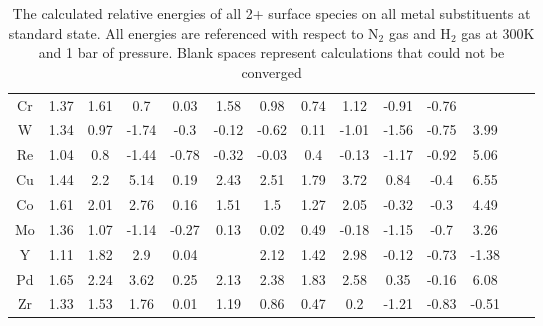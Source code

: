 \documentclass{article}
\begin{document}
\begin{table}
\begin{center}
\begin{tabular}{| c | c | c | c | c | c | c | c | c | c | c | c | c | c |}
Cr & 1.37 & 1.61 & 0.7 & 0.03 & 1.58 & 0.98 & 0.74 & 1.12 & -0.91 & -0.76 &  \\
W & 1.34 & 0.97 & -1.74 & -0.3 & -0.12 & -0.62 & 0.11 & -1.01 & -1.56 & -0.75 & 3.99 \\
Re & 1.04 & 0.8 & -1.44 & -0.78 & -0.32 & -0.03 & 0.4 & -0.13 & -1.17 & -0.92 & 5.06 \\
Cu & 1.44 & 2.2 & 5.14 & 0.19 & 2.43 & 2.51 & 1.79 & 3.72 & 0.84 & -0.4 & 6.55 \\
Co & 1.61 & 2.01 & 2.76 & 0.16 & 1.51 & 1.5 & 1.27 & 2.05 & -0.32 & -0.3 & 4.49 \\
Mo & 1.36 & 1.07 & -1.14 & -0.27 & 0.13 & 0.02 & 0.49 & -0.18 & -1.15 & -0.7 & 3.26 \\
Y & 1.11 & 1.82 & 2.9 & 0.04 &  & 2.12 & 1.42 & 2.98 & -0.12 & -0.73 & -1.38 \\
Pd & 1.65 & 2.24 & 3.62 & 0.25 & 2.13 & 2.38 & 1.83 & 2.58 & 0.35 & -0.16 & 6.08 \\
Zr & 1.33 & 1.53 & 1.76 & 0.01 & 1.19 & 0.86 & 0.47 & 0.2 & -1.21 & -0.83 & -0.51 \\
\hline
\end{tabular}
\end{center}
\caption{The calculated relative energies of all 2+ surface species on all metal substituents at standard state. All energies are referenced with respect to N$_2$ gas and H$_2$ gas at 300K and 1 bar of pressure. Blank spaces represent calculations that could not be converged}
\label{table:energies}
\end{table}
\end{document}
